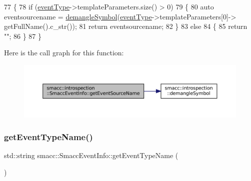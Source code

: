 \begin{DoxyCode}
77 \{
78     \textcolor{keywordflow}{if} (\hyperlink{structsmacc_1_1introspection_1_1SmaccEventInfo_af3bdf1abf797864e681662d92a5515f9}{eventType}->templateParameters.size() > 0)
79     \{
80         \textcolor{keyword}{auto} eventsourcename = \hyperlink{namespacesmacc_1_1introspection_a2f495108db3e57604d8d3ff5ef030302}{demangleSymbol}(\hyperlink{structsmacc_1_1introspection_1_1SmaccEventInfo_af3bdf1abf797864e681662d92a5515f9}{eventType}->templateParameters[0]->
      getFullName().c\_str());
81         \textcolor{keywordflow}{return} eventsourcename;
82     \}
83     \textcolor{keywordflow}{else}
84     \{
85         \textcolor{keywordflow}{return} \textcolor{stringliteral}{""};
86     \}
87 \}
\end{DoxyCode}
Here is the call graph for this function\+:
\nopagebreak
\begin{figure}[H]
\begin{center}
\leavevmode
\includegraphics[width=350pt]{structsmacc_1_1introspection_1_1SmaccEventInfo_af9e90a557f8f62069a17234f79bcefa0_cgraph}
\end{center}
\end{figure}
\mbox{\label{structsmacc_1_1introspection_1_1SmaccEventInfo_ae0ed6a9506dbe526269a0bd956a71044}} 
\subsubsection{\texorpdfstring{get\+Event\+Type\+Name()}{getEventTypeName()}}
{\footnotesize\ttfamily std\+::string smacc\+::\+Smacc\+Event\+Info\+::get\+Event\+Type\+Name (\begin{DoxyParamCaption}{ }\end{DoxyParamCaption})}



